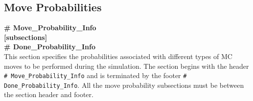 %
%
%
\subsection{Move Probabilities}\label{sec:Move_Probabilities}
{\bf\# Move\_Probability\_Info \\
{[}subsections] \\
\# Done\_Probability\_Info} \\

This section specifies the probabilities associated with different types of
MC moves to be performed during the simulation. 
The section begins with the header {\tt \# Move\_Probability\_Info} 
and is terminated by the footer {\tt \# Done\_Probability\_Info}.
All the move probability subsections must be between the section header and footer.
 
